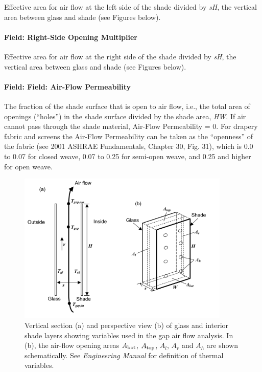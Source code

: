 Effective area for air flow at the left side of the shade divided by \emph{sH}, the vertical area between glass and shade (see Figures below).

\paragraph{Field: Right-Side Opening Multiplier}\label{field-right-side-opening-multiplier}

Effective area for air flow at the right side of the shade divided by \emph{sH}, the vertical area between glass and shade (see Figures below).

\paragraph{Field: Field: Air-Flow Permeability}\label{field-field-air-flow-permeability}

The fraction of the shade surface that is open to air flow, i.e., the total area of openings (``holes'') in the shade surface divided by the shade area, \emph{HW}. If air cannot pass through the shade material, Air-Flow Permeability = 0. For drapery fabric and screens the Air-Flow Permeability can be taken as the ``openness'' of the fabric (see 2001 ASHRAE Fundamentals, Chapter 30, Fig. 31), which is 0.0 to 0.07 for closed weave, 0.07 to 0.25 for semi-open weave, and 0.25 and higher for open weave.

\begin{figure}[hbtp] %
\centering
\includegraphics[width=0.9\textwidth, height=0.9\textheight, keepaspectratio=true]{media/image033.png}
\caption{Vertical section (a) and perspective view (b) of glass  and interior shade layers  showing variables used in the gap air flow analysis. In (b), the air-flow opening areas \(A_{\rm{bot}}\), \(A_{\rm{top}}\), \(A_{l}\), \(A_{r}\) and \(A_{h}\) are shown schematically. See \emph{Engineering Manual} for definition of thermal variables. \protect \label{fig:vertical-section-a-and-perspective-view-b-of}}
\end{figure}

